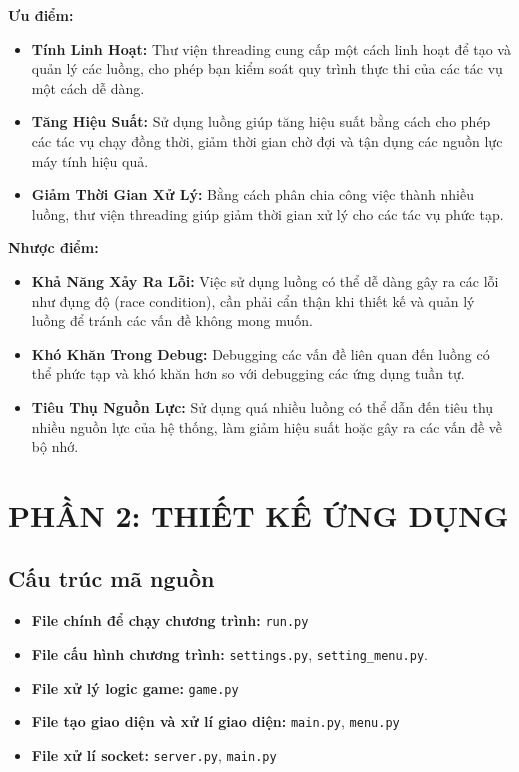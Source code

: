\documentclass[a4paper]{article}
\begin{document}
\textbf{Ưu điểm: }
\begin{itemize}
    \item \textbf{Tính Linh Hoạt:} Thư viện threading cung cấp một cách linh hoạt để tạo và quản lý các luồng, cho phép bạn kiểm soát quy trình thực thi của các tác vụ một cách dễ dàng.
    
    \item \textbf{Tăng Hiệu Suất:} Sử dụng luồng giúp tăng hiệu suất bằng cách cho phép các tác vụ chạy đồng thời, giảm thời gian chờ đợi và tận dụng các nguồn lực máy tính hiệu quả.
    
    \item \textbf{Giảm Thời Gian Xử Lý:} Bằng cách phân chia công việc thành nhiều luồng, thư viện threading giúp giảm thời gian xử lý cho các tác vụ phức tạp.
\end{itemize}    


\textbf{Nhược điểm: }
\begin{itemize}
    \item \textbf{Khả Năng Xảy Ra Lỗi:} Việc sử dụng luồng có thể dễ dàng gây ra các lỗi như đụng độ (race condition), cần phải cẩn thận khi thiết kế và quản lý luồng để tránh các vấn đề không mong muốn.
    
    \item \textbf{Khó Khăn Trong Debug:} Debugging các vấn đề liên quan đến luồng có thể phức tạp và khó khăn hơn so với debugging các ứng dụng tuần tự.
    
    \item \textbf{Tiêu Thụ Nguồn Lực:} Sử dụng quá nhiều luồng có thể dẫn đến tiêu thụ nhiều nguồn lực của hệ thống, làm giảm hiệu suất hoặc gây ra các vấn đề về bộ nhớ.
\end{itemize}
\newpage

\section*{PHẦN 2: THIẾT KẾ ỨNG DỤNG}
\setcounter{section}{2}
\setcounter{subsection}{0}
\subsection{Cấu trúc mã nguồn}
\begin{itemize}
    \item \textbf{File chính để chạy chương trình:} \texttt{run.py}
    \item \textbf{File cấu hình chương trình:} \texttt{settings.py}, \texttt{setting\_menu.py}.
    \item \textbf{File xử lý logic game:} 
    \texttt{game.py}
    \item \textbf{File tạo giao diện và xử lí giao diện:} \texttt{main.py}, \texttt{menu.py}
    \item \textbf{File xử lí socket:} \texttt{server.py}, \texttt{main.py}
\end{itemize}
\end{document}
